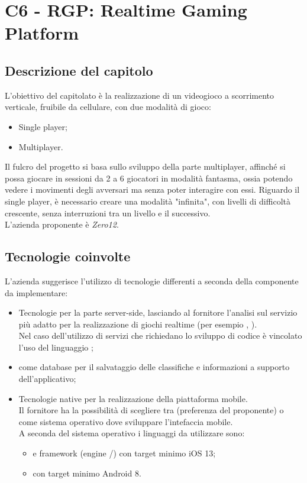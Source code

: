 \section{C6 - RGP: Realtime Gaming Platform}

\subsection{Descrizione del capitolo}

L'obiettivo del capitolato è la realizzazione di un videogioco a scorrimento verticale, fruibile da cellulare, con due modalità di gioco:
\begin{itemize}
\item Single player;
\item Multiplayer.
\end{itemize}  
Il fulcro del progetto si basa sullo sviluppo della parte multiplayer, affinché si possa giocare in sessioni da 2 a 6 giocatori in modalità fantasma, ossia potendo vedere i movimenti degli avversari ma senza poter interagire con essi.
Riguardo il single player, è necessario creare una modalità "infinita", con livelli di difficoltà crescente, senza interruzioni tra un livello e il successivo.\\
L'azienda proponente è \textit{Zero12}. 

\subsection{Tecnologie coinvolte}
L'azienda suggerisce l'utilizzo di tecnologie differenti a seconda della componente da implementare:
\begin{itemize}
\item Tecnologie  per la parte server-side, lasciando al fornitore l'analisi sul servizio più adatto per la realizzazione di giochi realtime (per esempio , ). \\
Nel caso dell'utilizzo di servizi che richiedano lo sviluppo di codice è vincolato l'uso del linguaggio ;
\item {} come database  per il salvataggio delle classifiche e informazioni a supporto dell'applicativo; 
\item Tecnologie native per la realizzazione della piattaforma mobile. \\ 
Il fornitore ha la possibilità di scegliere tra  (preferenza del proponente) o  come sistema operativo dove sviluppare l'intefaccia mobile. \\
A seconda del sistema operativo i linguaggi da utilizzare sono:
\begin{itemize}
\item {} e framework  (engine /) con target minimo iOS 13;
\item {} con target minimo Android 8.
\end{itemize}
\end{itemize}

